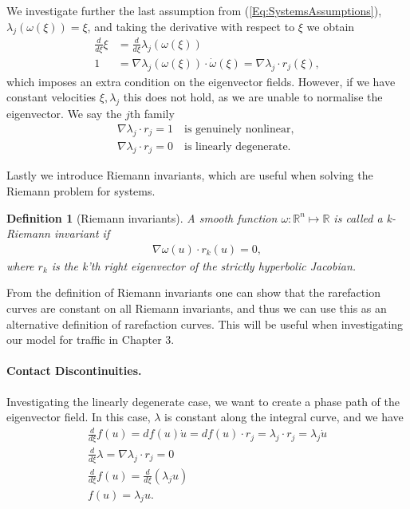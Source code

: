 \documentclass[10pt]{article}
\newtheorem{definition}{Definition}[section]
\numberwithin{equation}{section}
\begin{document}
We investigate further the last assumption from (\ref{Eq:SystemsAssumptions}), $ \lambda_j (\omega(\xi)) = \xi$, and taking the derivative with respect to $\xi$ we obtain
\begin{align*}
    \frac{d}{d\xi} \xi &= \frac{d}{d\xi} \lambda_j( \omega (\xi)) \\
    1 &= \nabla \lambda_j (\omega(\xi)) \cdot \dot \omega (\xi) = \nabla \lambda_j \cdot r_j(\xi),
    \label{Eq:DirectionOfLambda}
\end{align*} 
which imposes an extra condition on the eigenvector fields. However, if we have constant velocities $\xi, \lambda_j$ this does not hold, as we are unable to normalise the eigenvector. We say the $j$th family 
\begin{align*}
    \nabla \lambda_j \cdot r_j = 1 \quad \text{is genuinely nonlinear, } \\
    \nabla \lambda_j \cdot r_j = 0 \quad \text{is linearly degenerate. }
\end{align*}

Lastly we introduce Riemann invariants, which are useful when solving the Riemann problem for systems. \begin{definition}[Riemann invariants]
A smooth function $\omega : \mathbb{R}^n \mapsto \mathbb{R}$ is called a \textit{k-Riemann invariant} if 
\begin{align*}
    \nabla \omega(u) \cdot r_k (u) = 0,
\end{align*}
where $r_k$ is the k'th right eigenvector of the strictly hyperbolic Jacobian.
\end{definition}
From the definition of Riemann invariants one can show that the rarefaction curves are constant on all Riemann invariants, and thus we can use this as an alternative definition of rarefaction curves. This will be useful when investigating our model for traffic in Chapter $3$.  

\paragraph{Contact Discontinuities.}

Investigating the linearly degenerate case, we want to create a phase path of the eigenvector field. In this case, $\lambda$ is constant along the integral curve, and we have 
\begin{align*}
    \frac{d}{d\xi} f(u) = df(u) \dot u = df(u) \cdot r_j = \lambda_j \cdot r_j = \lambda_j \dot u \\
     \frac{d}{d\xi} \lambda = \nabla \lambda_j \cdot r_j = 0 \\
     \frac{d}{d\xi} f(u) =  \frac{d}{d\xi}( \lambda_j u ) \\
     f(u) = \lambda_j u. 
\end{align*}
\end{document}
